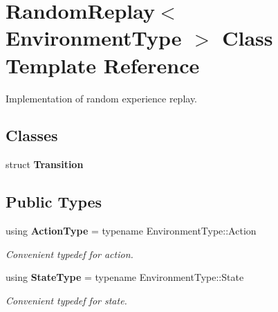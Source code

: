 \section{Random\+Replay$<$ Environment\+Type $>$ Class Template Reference}
\label{classmlpack_1_1rl_1_1RandomReplay}


Implementation of random experience replay.  


\subsection*{Classes}
\begin{DoxyCompactItemize}
\item 
struct \textbf{ Transition}
\end{DoxyCompactItemize}
\subsection*{Public Types}
\begin{DoxyCompactItemize}
\item 
using \textbf{ Action\+Type} = typename Environment\+Type\+::\+Action
\begin{DoxyCompactList}\small\item\em Convenient typedef for action. \end{DoxyCompactList}\item 
using \textbf{ State\+Type} = typename Environment\+Type\+::\+State
\begin{DoxyCompactList}\small\item\em Convenient typedef for state. \end{DoxyCompactList}\end{DoxyCompactItemize}
